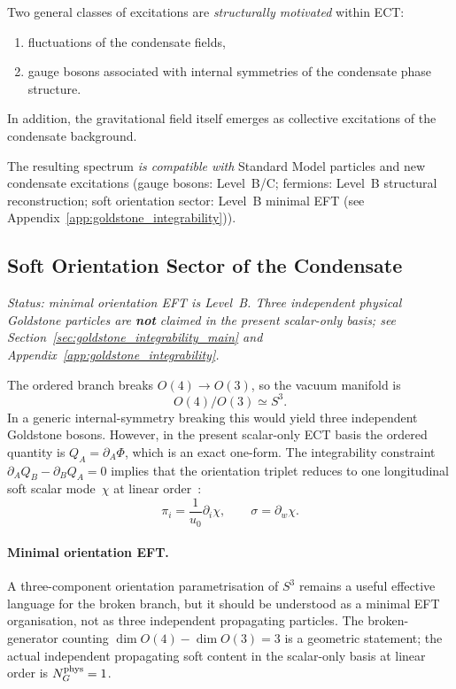 \documentclass[11pt,a4paper]{article}
\numberwithin{equation}{section}
\begin{document}
Two general classes of excitations are \emph{structurally motivated} within ECT:

\begin{enumerate}
\item fluctuations of the condensate fields,
\item gauge bosons associated with internal symmetries of the condensate phase structure.
\end{enumerate}

In addition, the gravitational field itself emerges as collective excitations of the condensate background.

The resulting spectrum \emph{is compatible with} Standard Model particles
and new condensate excitations (gauge bosons: Level~B/C; fermions:
Level~B structural reconstruction; soft orientation sector: Level~B minimal EFT
    (see Appendix~\ref{app:goldstone_integrability})).



\subsection{Soft Orientation Sector of the Condensate}
\label{sec:particle_soft_orientation}

\textit{Status: minimal orientation EFT is Level~B.
Three independent physical Goldstone particles are \textbf{not} claimed
in the present scalar-only basis; see Section~\ref{sec:goldstone_integrability_main}
and Appendix~\ref{app:goldstone_integrability}.}

The ordered branch breaks $O(4)\to O(3)$, so the vacuum manifold is
\begin{equation}
  O(4)/O(3)\simeq S^3.
\end{equation}
In a generic internal-symmetry breaking this would yield three
independent Goldstone bosons.
However, in the present scalar-only ECT basis the ordered quantity is
$Q_A=\partial_A\Phi$, which is an exact one-form.
The integrability constraint $\partial_A Q_B-\partial_B Q_A=0$ implies
that the orientation triplet reduces to one longitudinal soft scalar
mode~$\chi$ at linear order~\cite{Ivanov1975,McArthur2010}:
\begin{equation}
  \pi_i = \frac{1}{u_0}\partial_i\chi, \qquad \sigma = \partial_w\chi.
\end{equation}

\paragraph{Minimal orientation EFT.}
A three-component orientation parametrisation of $S^3$ remains a useful
effective language for the broken branch, but it should be understood
as a minimal EFT organisation, not as three independent propagating
particles.
The broken-generator counting $\dim O(4)-\dim O(3)=3$ is a
geometric statement; the actual independent propagating soft content
in the scalar-only basis at linear order is $N_G^{\rm phys}=1$.
\end{document}
